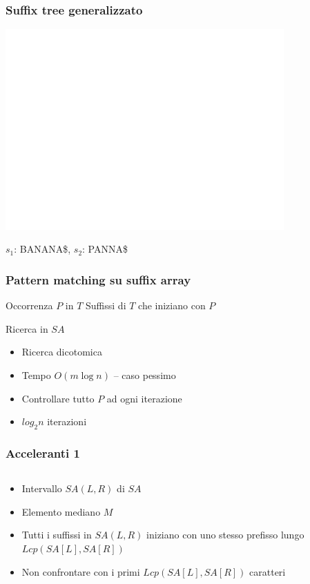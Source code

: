 \begin{frame}
\frametitle{Suffix tree generalizzato}
\begin{center}
\includegraphics[width=0.8\textwidth]{ST-banana-panna}
\end{center}
$s_{1}$: BANANA\$, $s_{2}$: PANNA\$
\end{frame}


\begin{frame}[fragile]
\frametitle{Pattern matching su suffix array}
\begin{block}{Occorrenza $P$ in $T$}
Suffissi di $T$ che iniziano con $P$
\end{block}
\begin{block}{Ricerca in $SA$}
\begin{itemize}
\item
Ricerca dicotomica
\item
Tempo $O(m \log n)$ -- caso pessimo
\item
Controllare tutto $P$ ad ogni iterazione
\item
$log_{2} n$ iterazioni
\end{itemize}
\end{block}
\end{frame}

\begin{frame}[fragile]
\frametitle{Acceleranti 1}
\begin{columns}
\begin{column}{0.5\textwidth}
\begin{itemize}
\item
Intervallo $SA(L, R)$ di $SA$
\item
Elemento mediano $M$
\item
Tutti i suffissi in $SA(L,R)$ iniziano con uno stesso prefisso lungo $Lcp(SA[L],
SA[R])$
\item
Non confrontare con i primi $Lcp(SA[L], SA[R])$ caratteri
\end{itemize}
\end{column}
\begin{column}{0.4\textwidth}
\begin{center}
\end{center}
\end{column}
\end{columns}
\end{frame}

